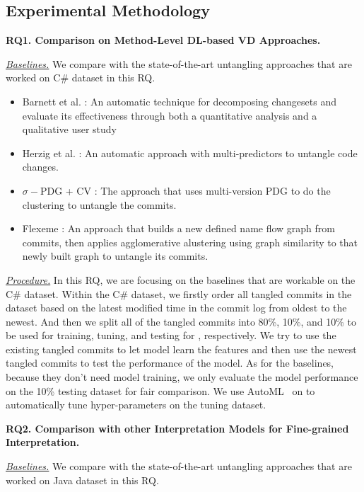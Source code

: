 

\subsection{Experimental Methodology}

\noindent\textbf{RQ1. Comparison on Method-Level DL-based VD Approaches.}

\textit{\underline{Baselines.}} We compare {\tool} with the state-of-the-art untangling approaches that are worked on C\# dataset in this RQ.

\begin{itemize}
	\item Barnett et al. \cite{barnett2015helping}: An automatic technique for decomposing changesets and evaluate its effectiveness through both a quantitative analysis and a qualitative user study
	\item Herzig et al. \cite{herzig2016impact}: An automatic approach with multi-predictors to untangle code changes.
	\item $\sigma-$PDG + CV \cite{flexeme-fse20}: The approach that uses multi-version PDG to do the clustering to untangle the commits.
	\item Flexeme \cite{flexeme-fse20}: An approach that builds a new defined name flow graph from commits, then applies 	agglomerative alustering using graph similarity to that newly built graph to untangle its commits.
\end{itemize}

\textit{\underline{Procedure.}}
In this RQ, we are focusing on the baselines that are workable on the C\# dataset. Within the C\# dataset, we firstly order all tangled commits in the dataset based on the latest modified time in the commit log from oldest to the newest. And then we split all of the tangled commits into 80\%, 10\%, and 10\% to be used for training, tuning, and testing for \tool, respectively. We try to use the existing tangled commits to let model learn the features and then use the newest tangled commits to test the performance of the model. As for the baselines, because they don't need model training, we only evaluate the model performance on the 10\% testing dataset for fair comparison. We use AutoML~\cite{NNI} on \tool to automatically tune hyper-parameters on the tuning dataset.

\noindent\textbf{RQ2. Comparison with other Interpretation Models for Fine-grained Interpretation.}

\textit{\underline{Baselines.}} We compare {\tool} with the state-of-the-art untangling approaches that are worked on Java dataset in this RQ.

